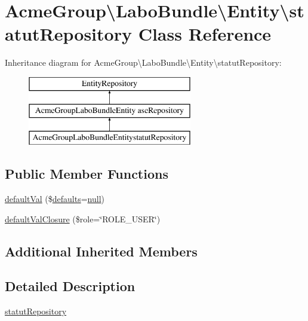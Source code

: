 \hypertarget{class_acme_group_1_1_labo_bundle_1_1_entity_1_1statut_repository}{\section{Acme\+Group\textbackslash{}Labo\+Bundle\textbackslash{}Entity\textbackslash{}statut\+Repository Class Reference}
\label{class_acme_group_1_1_labo_bundle_1_1_entity_1_1statut_repository}
}
Inheritance diagram for Acme\+Group\textbackslash{}Labo\+Bundle\textbackslash{}Entity\textbackslash{}statut\+Repository\+:\begin{figure}[H]
\begin{center}
\leavevmode
\includegraphics[height=3.000000cm]{class_acme_group_1_1_labo_bundle_1_1_entity_1_1statut_repository}
\end{center}
\end{figure}
\subsection*{Public Member Functions}
\begin{DoxyCompactItemize}
\item 
\hyperlink{class_acme_group_1_1_labo_bundle_1_1_entity_1_1statut_repository_ac27a4f92ca240e481093914f6e51b532}{default\+Val} (\$\hyperlink{model_8defaults_8js_a9114d742403a54e409eca2e2c78bff56}{defaults}=\hyperlink{validate_8js_afb8e110345c45e74478894341ab6b28e}{null})
\item 
\hyperlink{class_acme_group_1_1_labo_bundle_1_1_entity_1_1statut_repository_acecc9cab1cefecde9b2dd4f8839b04b1}{default\+Val\+Closure} (\$role=\char`\"{}R\+O\+L\+E\+\_\+\+U\+S\+E\+R\char`\"{})
\end{DoxyCompactItemize}
\subsection*{Additional Inherited Members}


\subsection{Detailed Description}
\hyperlink{class_acme_group_1_1_labo_bundle_1_1_entity_1_1statut_repository}{statut\+Repository}

